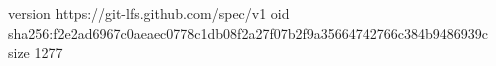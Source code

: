 version https://git-lfs.github.com/spec/v1
oid sha256:f2e2ad6967c0aeaec0778c1db08f2a27f07b2f9a35664742766c384b9486939c
size 1277
